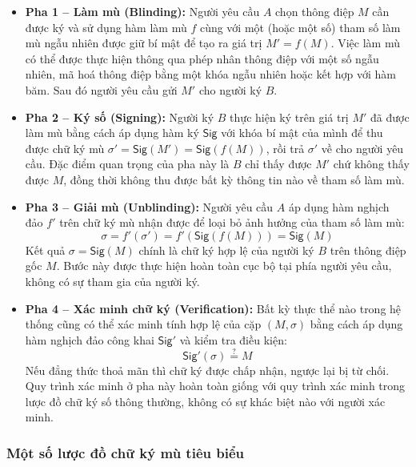 \begin{itemize}
    \item \textbf{Pha 1 -- Làm mù (Blinding):} Người yêu cầu $A$ chọn thông điệp $M$ cần được ký và sử dụng hàm làm mù $f$ cùng với một (hoặc một số) tham số làm mù ngẫu nhiên được giữ bí mật để tạo ra giá trị $M' = f(M)$. Việc làm mù có thể được thực hiện thông qua phép nhân thông điệp với một số ngẫu nhiên, mã hoá thông điệp bằng một khóa ngẫu nhiên hoặc kết hợp với hàm băm. Sau đó người yêu cầu gửi $M'$ cho người ký $B$.

    \item \textbf{Pha 2 -- Ký số (Signing):} Người ký $B$ thực hiện ký trên giá trị $M'$ đã được làm mù bằng cách áp dụng hàm ký $\textsf{Sig}$ với khóa bí mật của mình để thu được chữ ký mù $\sigma' = \textsf{Sig}(M') = \textsf{Sig}(f(M))$, rồi trả $\sigma'$ về cho người yêu cầu. Đặc điểm quan trọng của pha này là $B$ chỉ thấy được $M'$ chứ không thấy được $M$, đồng thời không thu được bất kỳ thông tin nào về tham số làm mù.

    \item \textbf{Pha 3 -- Giải mù (Unblinding):} Người yêu cầu $A$ áp dụng hàm nghịch đảo $f'$ trên chữ ký mù nhận được để loại bỏ ảnh hưởng của tham số làm mù:
    \begin{equation}
        \sigma = f'(\sigma') = f'(\textsf{Sig}(f(M))) = \textsf{Sig}(M)
        \label{eq:unblinding}
    \end{equation}
    Kết quả $\sigma = \textsf{Sig}(M)$ chính là chữ ký hợp lệ của người ký $B$ trên thông điệp gốc $M$. Bước này được thực hiện hoàn toàn cục bộ tại phía người yêu cầu, không có sự tham gia của người ký.

    \item \textbf{Pha 4 -- Xác minh chữ ký (Verification):} Bất kỳ thực thể nào trong hệ thống cũng có thể xác minh tính hợp lệ của cặp $(M, \sigma)$ bằng cách áp dụng hàm nghịch đảo công khai $\textsf{Sig}'$ và kiểm tra điều kiện:
    \begin{equation}
        \textsf{Sig}'(\sigma) \overset{?}{=} M
        \label{eq:blind-verify}
    \end{equation}
    Nếu đẳng thức thoả mãn thì chữ ký được chấp nhận, ngược lại bị từ chối. Quy trình xác minh ở pha này hoàn toàn giống với quy trình xác minh trong lược đồ chữ ký số thông thường, không có sự khác biệt nào với người xác minh.
\end{itemize}

\subsubsection{Một số lược đồ chữ ký mù tiêu biểu}

